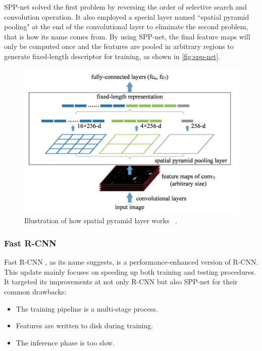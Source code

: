 SPP-net solved the first problem by reversing the order of selective search and
convolution operation.
It also employed a special layer named ``spatial pyramid pooling" at the
end of the convolutional layer to eliminate the second problem, that is how its 
name comes from.
By using SPP-net, the final feature maps will only be
computed once and the features are pooled in arbitrary regions to generate 
fixed-length descriptor for training, as shown in \autoref{fig:spp-net}.


\begin{figure}
    \begin{center}
    \includegraphics[scale=0.7]{figures/spp_net.png}
    \end{center}
    \caption{Illustration of how spatial pyramid layer works
    ~\protect\cite{spp-net-paper-2014}.}
    \label{fig:spp-net}
\end{figure}


\subsubsection{Fast R-CNN}

Fast R-CNN \cite{fast-r-cnn-paper-2015}, as its name suggests, is
a performance-enhanced version of R-CNN.
This update mainly focuses on speeding up both
training and testing procedures. It targeted its improvements
at not only R-CNN but also SPP-net for their common drawbacks:

\begin{itemize}
    \item The training pipeline is a multi-stage process.
    \item Features are written to disk during training.
    \item The inference phase is too slow.
\end{itemize}

